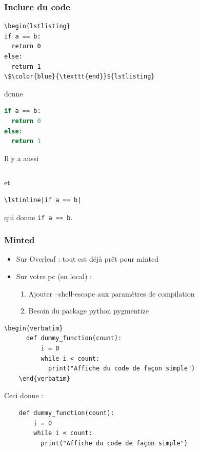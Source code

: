 \begin{frame}[fragile]
  \frametitle{Inclure du code}
  \begin{lstlisting}[mathescape=true]
\begin{lstlisting}
if a == b:
  return 0
else:
  return 1
\$\color{blue}{\texttt{end}}${lstlisting}\end{lstlisting}
donne
  \begin{lstlisting}[language=Python]
if a == b:
  return 0
else:
  return 1\end{lstlisting}

  Il y a aussi
  \begin{lstlisting}
\end{lstlisting}
  et
  \begin{lstlisting}
\lstinline|if a == b|\end{lstlisting}
  qui donne \lstinline|if a == b|.
\end{frame}


\begin{frame}[fragile]
  \frametitle{Minted}

  \begin{itemize}
    \item Sur Overleaf : tout est déjà prêt pour minted
    \item Sur votre pc (en local) :
    \begin{enumerate}
      \item Ajouter --shell-escape aux paramètres de compilation
      \item Besoin du package python pygmentize
    \end{enumerate}
  \end{itemize}

  \begin{lstlisting}[mathescape=true]
    \begin{verbatim}
      def dummy_function(count):
          i = 0
          while i < count:
            print("Affiche du code de façon simple")
    \end{verbatim}\end{lstlisting}

  Ceci donne :

  \begin{verbatim}
    def dummy_function(count):
        i = 0
        while i < count:
          print("Affiche du code de façon simple")
  \end{verbatim}
\end{frame}

